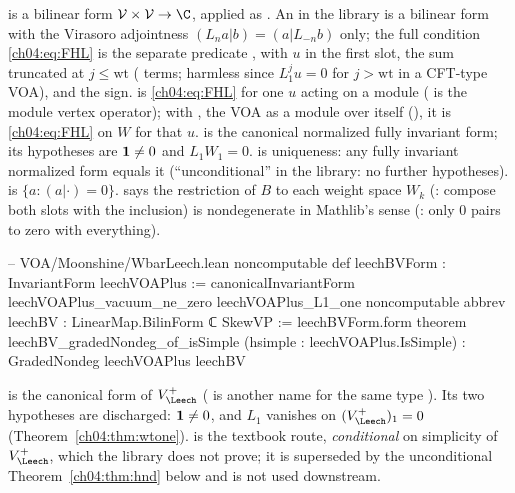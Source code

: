\begin{dictionary}
 is a bilinear form $\mathcal V\times\mathcal V\to\C$, applied as
. An  in the library is a bilinear form with the Virasoro
adjointness $(L_na|b)=(a|L_{-n}b)$ only; the full condition \eqref{ch04:eq:FHL} is the separate
predicate , with $u$ in the first slot, the sum truncated at $j\le\mathrm{wt}$
( terms; harmless since $L_1^ju=0$ for $j>\mathrm{wt}$ in a CFT-type VOA), and
 the sign.  is \eqref{ch04:eq:FHL} for one $u$ acting on a
module  ( is the module vertex operator); with , the
VOA as a module over itself (), it is \eqref{ch04:eq:FHL} on $W$ for that $u$.
 is the canonical normalized fully invariant form; its
hypotheses are $\mathbf{1}\neq0$ and $L_1W_1=0$.  is uniqueness: any
fully invariant normalized form equals it (``unconditional'' in the library: no further
hypotheses).  is $\{a:(a|\cdot)=0\}$.  says the restriction
of $B$ to each weight space $W_k$ (: compose both slots with the inclusion) is
nondegenerate in Mathlib's sense (: only $0$ pairs to zero with everything).
\end{dictionary}

\begin{leancode}
-- VOA/Moonshine/WbarLeech.lean
noncomputable def leechBVForm : InvariantForm leechVOAPlus :=
  canonicalInvariantForm leechVOAPlus_vacuum_ne_zero leechVOAPlus_L1_one
noncomputable abbrev leechBV : LinearMap.BilinForm ℂ SkewVP := leechBVForm.form
theorem leechBV_gradedNondeg_of_isSimple (hsimple : leechVOAPlus.IsSimple) :
    GradedNondeg leechVOAPlus leechBV
\end{leancode}

\begin{dictionary}
 is the canonical form of $V_\Leech^+$ ( is another name for the same
type ). Its two hypotheses are discharged: $\mathbf{1}\neq0$, and $L_1$ vanishes on
$(V_\Leech^+)_1=0$ (Theorem~\ref{ch04:thm:wtone}).  is the
textbook route, \emph{conditional} on simplicity of $V_\Leech^+$, which the library does not prove;
it is superseded by the unconditional Theorem~\ref{ch04:thm:hnd} below and is not used downstream.
\end{dictionary}

